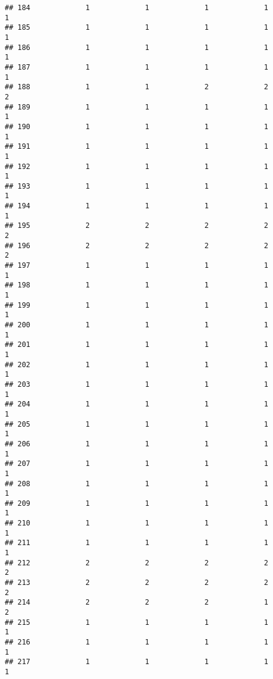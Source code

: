 \documentclass[
]{article}
\begin{document}
\begin{verbatim}
## 184             1             1             1             1             1
## 185             1             1             1             1             1
## 186             1             1             1             1             1
## 187             1             1             1             1             1
## 188             1             1             2             2             2
## 189             1             1             1             1             1
## 190             1             1             1             1             1
## 191             1             1             1             1             1
## 192             1             1             1             1             1
## 193             1             1             1             1             1
## 194             1             1             1             1             1
## 195             2             2             2             2             2
## 196             2             2             2             2             2
## 197             1             1             1             1             1
## 198             1             1             1             1             1
## 199             1             1             1             1             1
## 200             1             1             1             1             1
## 201             1             1             1             1             1
## 202             1             1             1             1             1
## 203             1             1             1             1             1
## 204             1             1             1             1             1
## 205             1             1             1             1             1
## 206             1             1             1             1             1
## 207             1             1             1             1             1
## 208             1             1             1             1             1
## 209             1             1             1             1             1
## 210             1             1             1             1             1
## 211             1             1             1             1             1
## 212             2             2             2             2             2
## 213             2             2             2             2             2
## 214             2             2             2             1             2
## 215             1             1             1             1             1
## 216             1             1             1             1             1
## 217             1             1             1             1             1

\end{verbatim}
\end{document}
